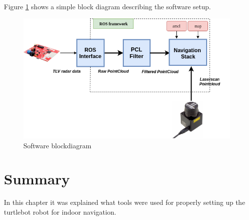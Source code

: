 Figure \ref{fig::softsetup} shows a simple block diagram describing  the software setup.
\begin{figure}[h] 
\centerline{\includegraphics [width=0.7 \textwidth]{imgs/chapter4/bd.png}}
\caption{Software blockdiagram}
\label{fig::softsetup}
\end{figure}





\section{Summary}
In this chapter it was explained what tools were used for properly setting up the turtlebot robot for indoor navigation.

